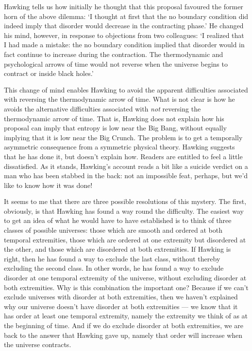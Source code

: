 \documentclass{article}
\begin{document}
Hawking tells us how initially he thought that this proposal favoured
the former horn of the above dilemma: `I thought at first that the no
boundary condition did indeed imply that disorder would decrease in the
contracting phase.' He changed his mind, however, in response to
objections from two colleagues: `I realized that I had made a mistake:
the no boundary condition implied that disorder would in fact continue
to increase during the contraction. The thermodynamic and psychological
arrows of time would not reverse when the universe begins to contract or
inside black holes.'

This change of mind enables Hawking to avoid the apparent difficulties
associated with reversing the thermodynamic arrow of time. What is not
clear is how he avoids the alternative difficulties associated with
\emph{not} reversing the thermodynamic arrow of time. That is, Hawking
does not explain how his proposal can imply that entropy is low near the
Big Bang, without equally implying that it is low near the Big Crunch.
The problem is to get a temporally asymmetric consequence from a
symmetric physical theory. Hawking suggests that he has done it, but
doesn't explain how. Readers are entitled to feel a little dissatisfied.
As it stands, Hawking's account reads a bit like a suicide verdict on a
man who has been stabbed in the back: not an impossible feat, perhaps,
but we'd like to know how it was done!

It seems to me that there are three possible resolutions of this
mystery. The first, obviously, is that Hawking has found a way round the
difficulty. The easiest way to get an idea of what he would have to have
established is to think of three classes of possible universes: those
which are smooth and ordered at both temporal extremities, those which
are ordered at one extremity but disordered at the other, and those
which are disordered at both extremities. If Hawking is right, then he
has found a way to exclude the last class, without thereby excluding the
second class. In other words, he has found a way to exclude disorder at
one temporal extremity of the universe, without excluding disorder at
both extremities. Why is this combination the important one? Because if
we can't exclude universes with disorder at both extremities, then we
haven't explained why our universe doesn't have disorder at both
extremities --- we know that it has order at least one temporal
extremity, namely the extremity we think of as at the beginning of time.
And if we do exclude disorder at both extremities, we are back to the
answer that Hawking gave up, namely that order will increase when the
universe contracts.
\end{document}
